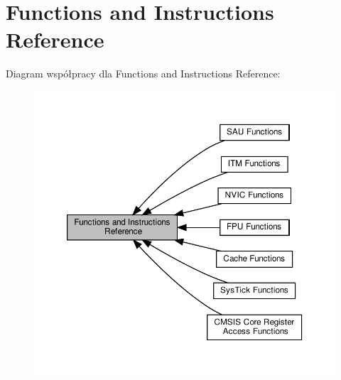 \hypertarget{group___c_m_s_i_s___core___function_interface}{}\section{Functions and Instructions Reference}
\label{group___c_m_s_i_s___core___function_interface}
Diagram współpracy dla Functions and Instructions Reference\+:\nopagebreak
\begin{figure}[H]
\begin{center}
\leavevmode
\includegraphics[width=350pt]{group___c_m_s_i_s___core___function_interface}
\end{center}
\end{figure}
